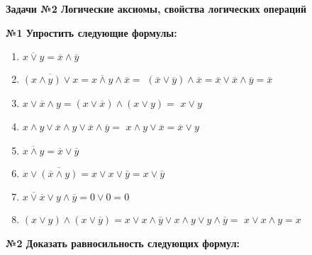 \usepackage{stmaryrd}%



    \begin{center}
        \textbf{Задачи №2 Логические аксиомы, свойства логических операций}\\
    \end{center}

    \begin{center}
        \textbf{№1 Упростить следующие формулы:}
    \end{center}


    \begin{enumerate}
        \item $\overline{x \vee y} = \overline x \wedge \overline y$

        \item $\overline{(x \wedge y) \vee x} = \overline{x \wedge y} \wedge \overline x = $
        $(\overline x \vee \overline y) \wedge \overline x = \overline x \vee \overline x \wedge \overline y = \overline x$

        \item $x \vee \overline x \wedge y = (x \vee \overline x) \wedge (x \vee y) = $
        $x \vee y$

        \item $x \wedge y \vee \overline x \wedge y \vee \overline x \wedge \overline y = $
        $x \wedge y \vee \overline x = \overline x \vee y$

        \item $\overline{x \wedge y} = \overline x \vee \overline y$

        \item $x \vee \overline{(\overline x \wedge y)} = x \vee x \vee \overline y = x \vee \overline y$

        \item $\overline{x \vee \overline x} \vee y \wedge \overline y = 0 \vee 0 = 0$

        \item $(x \vee y) \wedge (x \vee \overline y) =x \vee x \wedge \overline y \vee x \wedge y \vee y \wedge \overline y = $
        $x \vee x \wedge y = x$
    \end{enumerate}



    \begin{center}
        \textbf{№2 Доказать равносильность следующих формул:}
    \end{center}

